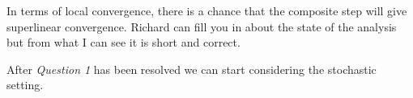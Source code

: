 \documentclass[12pt]{article}
\begin{document}
In terms of local convergence, there is a chance that the composite step will give superlinear convergence. Richard can fill you in about the state of the analysis but from what I can see it is short and correct.

After \emph{Question 1} has been resolved we can start considering the stochastic setting.



\newpage%


\end{document}
